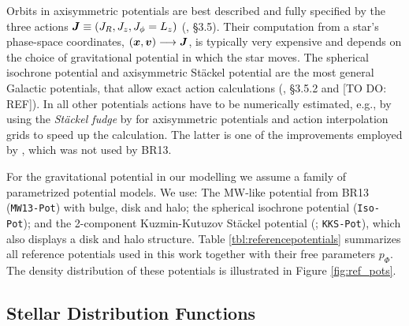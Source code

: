 Orbits in axisymmetric potentials are best described and fully specified by the three actions $\boldsymbol{J} \equiv (J_R, J_z, J_\phi=L_z)$ (\citealt{2008gady.book.....B}, \S 3.5). Their computation from a star's phase-space coordinates, $(\boldsymbol{x},\boldsymbol{v}) \longrightarrow \boldsymbol{J}$, is typically very expensive and depends on the choice of gravitational potential in which the star moves. The spherical isochrone potential \citep{1959AnAp...22..126H} and axisymmetric St\"{a}ckel potential \Wilma{[TO DO: REF]} are the most general Galactic potentials, that allow exact action calculations (\citealt{2008gady.book.....B}, \S 3.5.2 and [TO DO: REF]). In all other potentials actions have to be numerically estimated, e.g., by using the \emph{St\"{a}ckel fudge} by \citet{2012MNRAS.426.1324B} for axisymmetric potentials and action interpolation grids \citep{2015ApJS..216...29B,2012MNRAS.426.1324B} to speed up the calculation. The latter is one of the improvements employed by \RM{}, which was not used by BR13.

For the gravitational potential in our modelling we assume a family of parametrized potential models. We use: The MW-like potential from BR13 (\texttt{MW13-Pot}) with bulge, disk and halo; the spherical isochrone potential (\texttt{Iso-Pot}); and the 2-component Kuzmin-Kutuzov St\"{a}ckel potential (\citealt{1994AA...287...43B}; \texttt{KKS-Pot}), which also displays a disk and halo structure. Table \ref{tbl:referencepotentials} summarizes all reference potentials used in this work together with their free parameters $p_\Phi$. The density distribution of these potentials is illustrated in Figure \ref{fig:ref_pots}.\\




\subsection{Stellar Distribution Functions} \label{sec:qDF}

